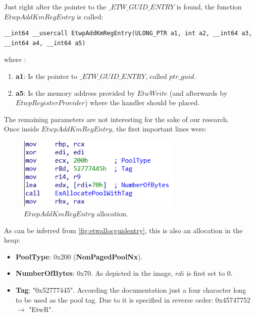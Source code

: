 Just right after the pointer to the $\_ETW\_GUID\_ENTRY$ is found, the function $EtwpAddKmRegEntry$ is called:
\begin{verbatim}
__int64 __usercall EtwpAddKmRegEntry(ULONG_PTR a1, int a2, __int64 a3,
__int64 a4, __int64 a5)
\end{verbatim}

where :
\begin{enumerate}
\setlength\itemsep{0.05em}
  \item {\bfseries a1}: Is the pointer to $\_ETW\_GUID\_ENTRY$, called $ptr\_guid$. 
  \item {\bfseries a5}: Is the memory address provided by $EtwWrite$ (and afterwards by $EtwpRegisterProvider$) where the handler should be placed. 
\end{enumerate}
The remaining parameters are not interesting for the sake of our research.\\

Once inside $EtwpAddKmRegEntry$, the first important lines were:

\begin{centering}
  \begin{figure}[H]
    \includegraphics[width=8cm]{images/etwpaddkm_reserve_heap_for_handler.png}
    \caption[]{$EtwpAddKmRegEntry$ allocation.}
    \label{fig:etwpaddkm_allocate_handler}
  \end{figure}
\end{centering}

As can be inferred from \ref{fig:etwallocguidentry}, this is also an allocation in the heap: 

\begin{itemize}
  \setlength\itemsep{0.05em}
  \item {\bfseries PoolType}: 0x200 ({\bfseries NonPagedPoolNx}).
  \item {\bfseries NumberOfBytes}: 0x70. As depicted in the image, $rdi$ is first set to 0. 
  \item {\bfseries Tag}: "0x52777445". According the documentation just a four character long to be used as the pool tag. Due to it is specified in reverse order: 0x45747752 $\rightarrow$ "EtwR".
\end{itemize}


